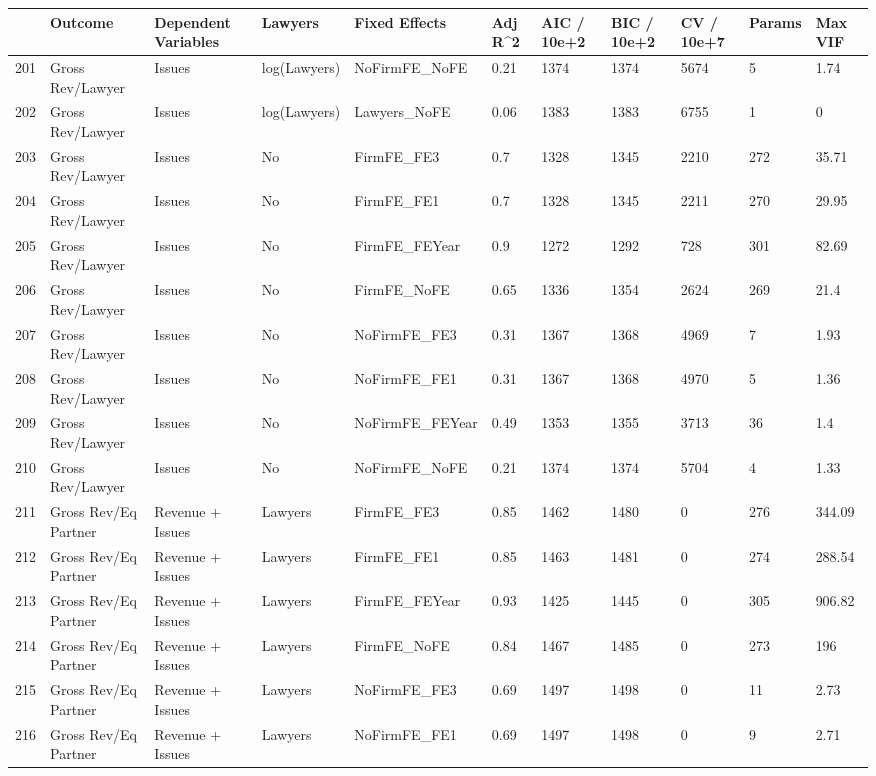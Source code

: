\begin{table}[ht]
\centering
\begin{tabular}{rllllllllll}
  \hline
 & Outcome & Dependent Variables & Lawyers & Fixed Effects & Adj R^2 & AIC / 10e+2 & BIC / 10e+2 & CV / 10e+7 & Params & Max VIF \\ 
  \hline
201 & Gross Rev/Lawyer & Issues & log(Lawyers) & NoFirmFE\_NoFE & 0.21 & 1374 & 1374 & 5674 & 5 & 1.74 \\ 
  202 & Gross Rev/Lawyer & Issues & log(Lawyers) & Lawyers\_NoFE & 0.06 & 1383 & 1383 & 6755 & 1 & 0 \\ 
  203 & Gross Rev/Lawyer & Issues & No & FirmFE\_FE3 & 0.7 & 1328 & 1345 & 2210 & 272 & 35.71 \\ 
  204 & Gross Rev/Lawyer & Issues & No & FirmFE\_FE1 & 0.7 & 1328 & 1345 & 2211 & 270 & 29.95 \\ 
  205 & Gross Rev/Lawyer & Issues & No & FirmFE\_FEYear & 0.9 & 1272 & 1292 & 728 & 301 & 82.69 \\ 
  206 & Gross Rev/Lawyer & Issues & No & FirmFE\_NoFE & 0.65 & 1336 & 1354 & 2624 & 269 & 21.4 \\ 
  207 & Gross Rev/Lawyer & Issues & No & NoFirmFE\_FE3 & 0.31 & 1367 & 1368 & 4969 & 7 & 1.93 \\ 
  208 & Gross Rev/Lawyer & Issues & No & NoFirmFE\_FE1 & 0.31 & 1367 & 1368 & 4970 & 5 & 1.36 \\ 
  209 & Gross Rev/Lawyer & Issues & No & NoFirmFE\_FEYear & 0.49 & 1353 & 1355 & 3713 & 36 & 1.4 \\ 
  210 & Gross Rev/Lawyer & Issues & No & NoFirmFE\_NoFE & 0.21 & 1374 & 1374 & 5704 & 4 & 1.33 \\ 
  211 & Gross Rev/Eq Partner & Revenue + Issues & Lawyers & FirmFE\_FE3 & 0.85 & 1462 & 1480 & 0 & 276 & 344.09 \\ 
  212 & Gross Rev/Eq Partner & Revenue + Issues & Lawyers & FirmFE\_FE1 & 0.85 & 1463 & 1481 & 0 & 274 & 288.54 \\ 
  213 & Gross Rev/Eq Partner & Revenue + Issues & Lawyers & FirmFE\_FEYear & 0.93 & 1425 & 1445 & 0 & 305 & 906.82 \\ 
  214 & Gross Rev/Eq Partner & Revenue + Issues & Lawyers & FirmFE\_NoFE & 0.84 & 1467 & 1485 & 0 & 273 & 196 \\ 
  215 & Gross Rev/Eq Partner & Revenue + Issues & Lawyers & NoFirmFE\_FE3 & 0.69 & 1497 & 1498 & 0 & 11 & 2.73 \\ 
  216 & Gross Rev/Eq Partner & Revenue + Issues & Lawyers & NoFirmFE\_FE1 & 0.69 & 1497 & 1498 & 0 & 9 & 2.71 \\ 

\end{tabular}
\end{table}
